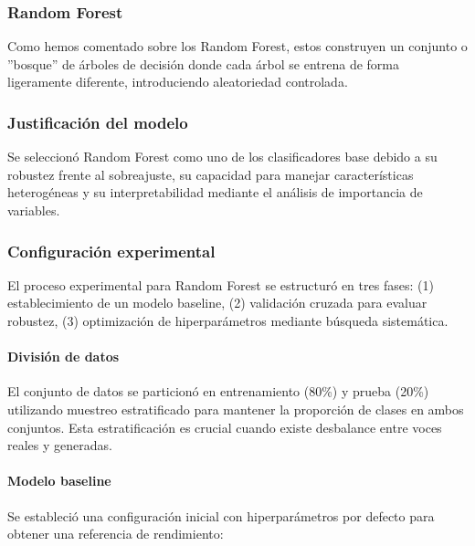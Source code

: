 \subsubsection{Random Forest}

Como hemos comentado sobre los Random Forest, estos construyen un conjunto o ''bosque'' de árboles de decisión donde cada árbol se entrena de forma ligeramente diferente, introduciendo aleatoriedad controlada.

\subsubsection*{Justificación del modelo}

Se seleccionó Random Forest como uno de los clasificadores base debido a su robustez frente al sobreajuste, su capacidad para manejar características heterogéneas y su interpretabilidad mediante el análisis de importancia de variables.

\subsubsection*{Configuración experimental}

El proceso experimental para Random Forest se estructuró en tres fases: (1) establecimiento de un modelo baseline, (2) validación cruzada para evaluar robustez, (3) optimización de hiperparámetros mediante búsqueda sistemática.

\paragraph{División de datos}
El conjunto de datos se particionó en entrenamiento (80\%) y prueba (20\%) utilizando muestreo estratificado para mantener la proporción de clases en ambos conjuntos. Esta estratificación es crucial cuando existe desbalance entre voces reales y generadas.

\paragraph{Modelo baseline}
Se estableció una configuración inicial con hiperparámetros por defecto para obtener una referencia de rendimiento:

